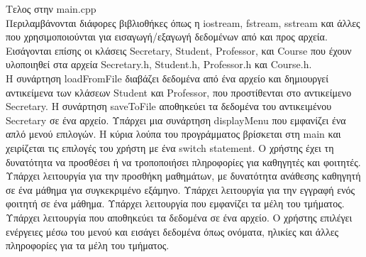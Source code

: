 \documentclass[12pt]{article}
\begin{document}
Τελος στην main.cpp\\
Περιλαμβάνονται διάφορες βιβλιοθήκες όπως η iostream, fstream, sstream και άλλες που χρησιμοποιούνται για εισαγωγή/εξαγωγή δεδομένων από και προς αρχεία.
Εισάγονται επίσης οι κλάσεις Secretary, Student, Professor, και Course που έχουν υλοποιηθεί στα αρχεία Secretary.h, Student.h, Professor.h και Course.h.\\
Η συνάρτηση loadFromFile διαβάζει δεδομένα από ένα αρχείο και δημιουργεί αντικείμενα των κλάσεων Student και Professor, που προστίθενται στο αντικείμενο Secretary.
Η συνάρτηση saveToFile αποθηκεύει τα δεδομένα του αντικειμένου Secretary σε ένα αρχείο.
Υπάρχει μια συνάρτηση displayMenu που εμφανίζει ένα απλό μενού επιλογών.
Η κύρια λούπα του προγράμματος βρίσκεται στη main και χειρίζεται τις επιλογές του χρήστη με ένα switch statement.
Ο χρήστης έχει τη δυνατότητα να προσθέσει ή να τροποποιήσει πληροφορίες για καθηγητές και φοιτητές.
Υπάρχει λειτουργία για την προσθήκη μαθημάτων, με δυνατότητα ανάθεσης καθηγητή σε ένα μάθημα για συγκεκριμένο εξάμηνο.
Υπάρχει λειτουργία για την εγγραφή ενός φοιτητή σε ένα μάθημα.
Υπάρχει λειτουργία που εμφανίζει τα μέλη του τμήματος.
Υπάρχει λειτουργία που αποθηκεύει τα δεδομένα σε ένα αρχείο.
Ο χρήστης επιλέγει ενέργειες μέσω του μενού και εισάγει δεδομένα όπως ονόματα, ηλικίες και άλλες πληροφορίες για τα μέλη του τμήματος.
\end{document}
